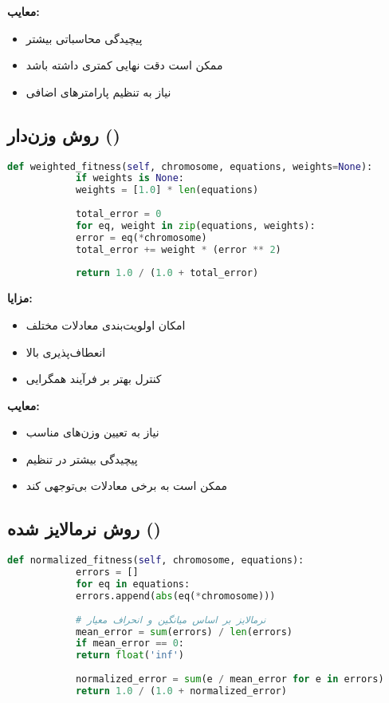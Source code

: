 \documentclass[12pt,a4paper]{article}
\newenvironment{ltrcode}{\lr\bgroup}{\egroup}
\begin{document}
	\textbf{معایب:}
	\begin{itemize}
		\item پیچیدگی محاسباتی بیشتر
		\item ممکن است دقت نهایی کمتری داشته باشد
		\item نیاز به تنظیم پارامترهای اضافی
	\end{itemize}
	
	\subsection{روش وزن‌دار ()}
	
	\begin{ltrcode}
		\begin{lstlisting}[language=Python, caption=تابع شایستگی وزن‌دار]
			def weighted_fitness(self, chromosome, equations, weights=None):
			if weights is None:
			weights = [1.0] * len(equations)
			
			total_error = 0
			for eq, weight in zip(equations, weights):
			error = eq(*chromosome)
			total_error += weight * (error ** 2)
			
			return 1.0 / (1.0 + total_error)
		\end{lstlisting}
	\end{ltrcode}
	
	\textbf{مزایا:}
	\begin{itemize}
		\item امکان اولویت‌بندی معادلات مختلف
		\item انعطاف‌پذیری بالا
		\item کنترل بهتر بر فرآیند همگرایی
	\end{itemize}
	
	\textbf{معایب:}
	\begin{itemize}
		\item نیاز به تعیین وزن‌های مناسب
		\item پیچیدگی بیشتر در تنظیم
		\item ممکن است به برخی معادلات بی‌توجهی کند
	\end{itemize}
	
	\subsection{روش نرمالایز شده ()}
	
	\begin{ltrcode}
		\begin{lstlisting}[language=Python, caption=تابع شایستگی نرمالایز شده]
			def normalized_fitness(self, chromosome, equations):
			errors = []
			for eq in equations:
			errors.append(abs(eq(*chromosome)))
			
			# نرمالایز بر اساس میانگین و انحراف معیار
			mean_error = sum(errors) / len(errors)
			if mean_error == 0:
			return float('inf')
			
			normalized_error = sum(e / mean_error for e in errors)
			return 1.0 / (1.0 + normalized_error)
		\end{lstlisting}
	\end{ltrcode}
	
\end{document}
